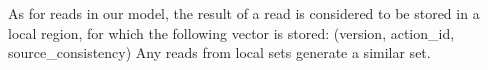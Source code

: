 \documentclass[preprint, numbers]{sigplanconf}
\begin{document}
As for reads in our model, the result of a read is considered to be stored in a
local region, for which the following vector is stored:  (version, action\_id,
source\_consistency) Any reads from local sets generate a similar set.



%



%
\end{document}
